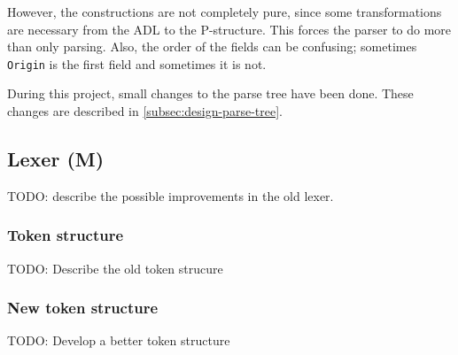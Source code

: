 However, the constructions are not completely pure, since some transformations are necessary from the ADL to the P-structure.
This forces the parser to do more than only parsing.
Also, the order of the fields can be confusing; sometimes \texttt{Origin} is the first field and sometimes it is not.

During this project, small changes to the parse tree have been done.
These changes are described in \autoref{subsec:design-parse-tree}.

\subsection{Lexer (M)}
\label{subsec:analysis-lexer}
TODO: describe the possible improvements in the old lexer.

\subsubsection{Token structure}
TODO: Describe the old token strucure

\subsubsection{New token structure}
TODO: Develop a better token structure

